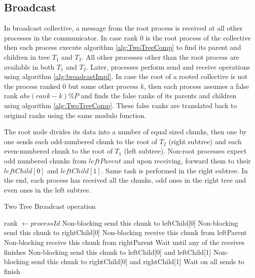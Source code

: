 \documentclass[sigplan,review,anonymous]{acmart}\settopmatter{printfolios=true,printccs=false,printacmref=false}
\begin{document}
\subsection{Broadcast} \label{sec:broad}
In broadcast collective, a message from the root process is received at all other processes in the communicator. In case rank $0$ is the root process of the collective then each process execute algorithm \ref{alg:TwoTreeComp} to find its parent and children in tree $T_1$ and $T_2$. All other processes other than the root process are available in both $T_1$ and $T_2$. Later, processes perform send and receive operations using algorithm \ref{alg:broadcastImpl}. In case the root of a rooted collective is not the process ranked $0$ but some other process $k$, then each process assumes a false rank $abs(rank-k)\%P$ and finds the false ranks of its parents and children using algorithm \ref{alg:TwoTreeComp}. These false ranks are translated back to original ranks using the same modulo function. 

The root node divides its data into a number of equal sized chunks, then one by one sends each odd-numbered chunk to the root of $T_2$ (right subtree) and each even-numbered chunk to the root of $T_1$ (left subtree). Non-root processes expect odd numbered chunks from $leftParent$ and upon receiving, forward them to their $leftChild[0]$ and $leftChild[1]$. Same task is performed in the right subtree. In the end, each process has received all the chunks, odd ones in the right tree and even ones in the left subtree.

\begin{algorithm}
  \scriptsize
\caption{Two Tree Broadcast operation}\label{alg:broadcastImpl}
\begin{algorithmic}[1]
\REQUIRE rank $\leftarrow processId$ 
            \STATE Non-blocking send this chunk to leftChild[0]
        \ELSE
            \STATE Non-blocking send this chunk to rightChild[0]
        \ENDIF
    \ENDFOR
{}
            \STATE Non-blocking receive this chunk from leftParent
            \STATE Non-blocking receive this chunk from rightParent
        \ENDIF
    \ENDFOR
        \STATE Wait until any of the receives finishes
            \STATE Non-blocking send this chunk to leftChild[0] and leftChild[1]
            \STATE Non-blocking send this chunk to rightChild[0] and rightChild[1]
        \ENDIF
    \ENDWHILE
\ENDIF
\STATE Wait on all sends to finish
\end{algorithmic}
\end{algorithm}
\end{document}

